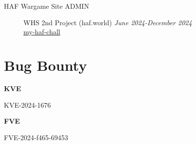 \documentclass[margin,line]{resume}
\begin{document}
\begin{resume}
\begin{description}
                \item[HAF Wargame Site ADMIN]\small{WHS 2nd Project (haf.world) \hfill \textsl{June 2024-December 2024}}\\
  	      		\faGithub\space\href{https://github.com/minchan02/WarGame}{my-haf-chall}
 			\vspace{2mm}
    \end{description}
    \vspace{2cm} 
    \newpage

        \section{\mysidestyle Bug Bounty}\vspace{2mm}
        \textbf{KVE}
        \vspace{1mm}
        \begin{list2}
          \item KVE-2024-1676
        \end{list2}
        
        \textbf{FVE}
        \vspace{1mm}
        \begin{list2}
          \item FVE-2024-f465-69453
        \end{list2}
\end{resume}   
\end{document}
